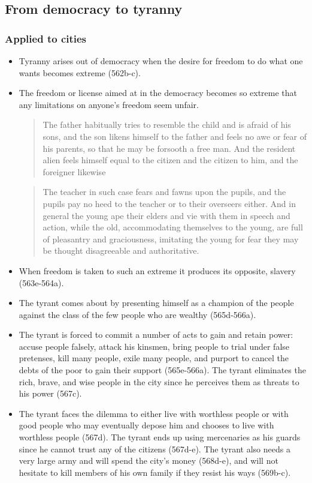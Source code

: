\documentclass[oneside]{article}
\begin{document}
\subsection*{From democracy to tyranny}

\subsubsection*{Applied to cities} 

\begin{itemize}
\item Tyranny arises out of democracy when the desire for
freedom to do what one wants becomes extreme (562b-c).
\item The freedom or license aimed at in the democracy becomes so extreme
that any limitations on anyone's freedom seem unfair.

\begin{quote}
The father habitually tries to resemble the child and is afraid of his
sons, and the son likens himself to the father and feels no awe or fear
of his parents, so that he may be forsooth a free man. And the resident
alien feels himself equal to the citizen and the citizen to him, and the
foreigner likewise
\end{quote}

\begin{quote}
The teacher in such case fears and fawns upon the pupils, and the pupils
pay no heed to the teacher or to their overseers either. And in general
the young ape their elders and vie with them in speech and action, while
the old, accommodating themselves to the young, are full of pleasantry
and graciousness, imitating the young for fear they may be thought
disagreeable and authoritative.
\end{quote}

\item When freedom is taken to such an extreme it produces its opposite,
  slavery (563e-564a).
\item The tyrant comes about by presenting himself as a champion of the
  people against the class of the few people who are wealthy
  (565d-566a).
\item The tyrant is forced to commit a number of acts to gain and retain
  power: accuse people falsely, attack his kinsmen, bring people to
  trial under false pretenses, kill many people, exile many people, and
  purport to cancel the debts of the poor to gain their support
  (565e-566a). The tyrant eliminates the rich, brave, and wise people in
  the city since he perceives them as threats to his power (567c).
\item  The tyrant faces the dilemma to either live with worthless people or
  with good people who may eventually depose him and chooses to live
  with worthless people (567d). The tyrant ends up using mercenaries as
  his guards since he cannot trust any of the citizens (567d-e). The
  tyrant also needs a very large army and will spend the city's money
  (568d-e), and will not hesitate to kill members of his own family if
  they resist his ways (569b-c).
\end{itemize}
\end{document}
